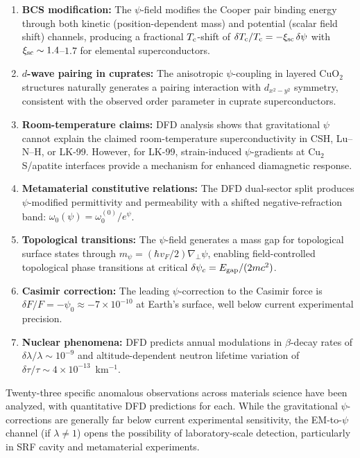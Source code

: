 \documentclass[aps,prb,twocolumn,superscriptaddress,floatfix,nofootinbib,longbibliography]{revtex4-2}
\newcommand{\Tc}{T_{\rm c}}
\begin{document}
\begin{enumerate}
\item \textbf{BCS modification:} The $\psi$-field modifies the Cooper
  pair binding energy through both kinetic (position-dependent mass) and
  potential (scalar field shift) channels, producing a fractional
  $\Tc$-shift of $\delta\Tc/\Tc = -\xi_{\rm sc}\,\delta\psi$ with
  $\xi_{\rm sc} \sim 1.4$--$1.7$ for elemental superconductors.

\item \textbf{$d$-wave pairing in cuprates:} The anisotropic
  $\psi$-coupling in layered CuO$_2$ structures naturally generates a
  pairing interaction with $d_{x^2-y^2}$ symmetry, consistent with the
  observed order parameter in cuprate superconductors.

\item \textbf{Room-temperature claims:} DFD analysis shows that
  gravitational $\psi$ cannot explain the claimed room-temperature
  superconductivity in CSH, Lu--N--H, or LK-99.  However, for LK-99,
  strain-induced $\psi$-gradients at Cu$_2$S/apatite interfaces provide
  a mechanism for enhanced diamagnetic response.

\item \textbf{Metamaterial constitutive relations:} The DFD dual-sector
  split produces $\psi$-modified permittivity and permeability with a
  shifted negative-refraction band: $\omega_0(\psi) = \omega_0^{(0)}/e^\psi$.

\item \textbf{Topological transitions:} The $\psi$-field generates a
  mass gap for topological surface states through
  $m_\psi = (\hbar v_F/2)\nabla_\perp\psi$, enabling field-controlled
  topological phase transitions at critical
  $\delta\psi_c = E_{\rm gap}/(2mc^2)$.

\item \textbf{Casimir correction:} The leading $\psi$-correction to the
  Casimir force is $\delta F/F = -\psi_0 \approx -7\times 10^{-10}$ at
  Earth's surface, well below current experimental precision.

\item \textbf{Nuclear phenomena:} DFD predicts annual modulations in
  $\beta$-decay rates of $\delta\lambda/\lambda \sim 10^{-9}$ and
  altitude-dependent neutron lifetime variation of
  $\delta\tau/\tau \sim 4\times 10^{-13}$~km$^{-1}$.
\end{enumerate}

Twenty-three specific anomalous observations across materials science
have been analyzed, with quantitative DFD predictions for each.  While
the gravitational $\psi$-corrections are generally far below current
experimental sensitivity, the EM-to-$\psi$ channel (if $\lambda \neq 1$)
opens the possibility of laboratory-scale detection, particularly in SRF
cavity and metamaterial experiments.
\end{document}
